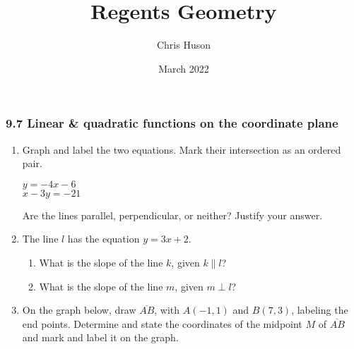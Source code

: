 \documentclass[12pt, twoside]{article}
\title{Regents Geometry}
\author{Chris Huson}
\date{March 2022}
\begin{document}
\subsubsection*{9.7 Linear \& quadratic functions on the coordinate plane}
  \begin{enumerate}

  \item Graph and label the two equations. Mark their intersection as an ordered pair.

    \begin{multicols}{2}
      $y = -4x-6$ \\
      $x-3y = -21$
    \end{multicols}  \vspace{1cm}
    Are the lines parallel, perpendicular, or neither? Justify your answer.
    \vspace{1.5cm}

    \begin{center} %
    \end{center}

  \item The line $l$ has the equation $y= 3x+2$.
  \begin{enumerate}
    \item What is the slope of the line $k$, given $k \parallel l$?
    \vspace{1cm}
    \item What is the slope of the line $m$, given $m \perp l$?
    \vspace{1cm}
  \end{enumerate}

\newpage
\item On the graph below, draw $\overline{AB}$, with $A(-1,1)$ and $B(7,3)$, labeling the end points. Determine and state the coordinates of the midpoint $M$ of $\overline{AB}$ and mark and label it on the graph.\\


\end{enumerate}
\end{document}
